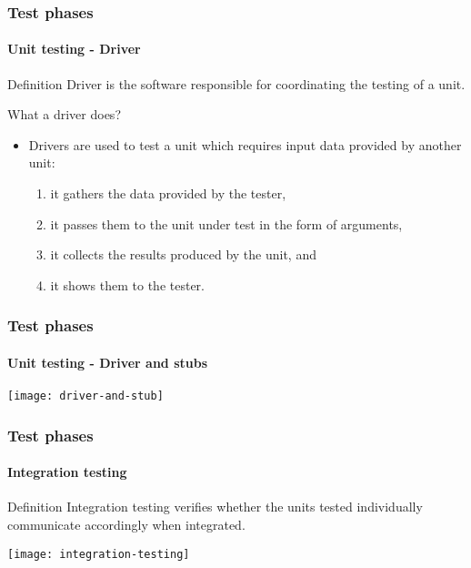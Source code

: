 \begin{frame}
\frametitle{Test phases}
\framesubtitle{Unit testing - Driver}
\label{concept:driver}
\label{concept:test-driver}

\begin{block:concept}{Definition}
Driver is the software responsible for coordinating the testing of a unit.
\end{block:concept}

\begin{block:fact}{What a driver does?}
\begin{itemize}
	\item Drivers are used to test a unit which requires input data provided
	by another unit:
	\begin{enumerate}
		\item it gathers the data provided by the tester,
		\item it passes them to the unit under test in the form of arguments,
		\item it collects the results produced by the unit, and
		\item it shows them to the tester.
	\end{enumerate}
\end{itemize}
\end{block:fact}
\end{frame}


\begin{frame}[c]
\frametitle{Test phases}
\framesubtitle{Unit testing - Driver and stubs}

\begin{block:fact}{}
	\centering
	\texttt{[image: driver-and-stub]}
\end{block:fact}
\end{frame}



\begin{frame}
\label{concept:integration-testing}
\frametitle{Test phases}
\framesubtitle{Integration testing}

\begin{block:concept}{Definition}
Integration testing verifies whether the units tested individually communicate
accordingly when integrated.
\end{block:concept}

\begin{block:fact}{}
    \centering
    \texttt{[image: integration-testing]}
\end{block:fact}

\hfill
{}
\end{frame}



